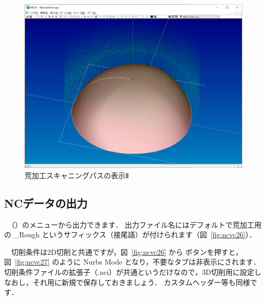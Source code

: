 \begin{figure}[H]
\centering
\includegraphics[scale=0.5]{No2/fig/fig25.png}
\caption{荒加工スキャニングパスの表示Ⅱ}
\label{fig:ncvc25}
\end{figure}

\subsection{NCデータの出力}
　（）のメニューから出力できます．
出力ファイル名にはデフォルトで荒加工用の \_Rough というサフィックス（接尾語）が付けられます（図~\ref{fig:ncvc26}）．

　切削条件は2D切削と共通ですが，図~\ref{fig:ncvc26} から ボタンを押すと，図~\ref{fig:ncvc27} のように Nurbs Mode となり，不要なタブは非表示にされます．
切削条件ファイルの拡張子（.nci）が共通というだけなので，3D切削用に設定しなおし，それ用に新規で保存しておきましょう．
カスタムヘッダー等も同様です．

